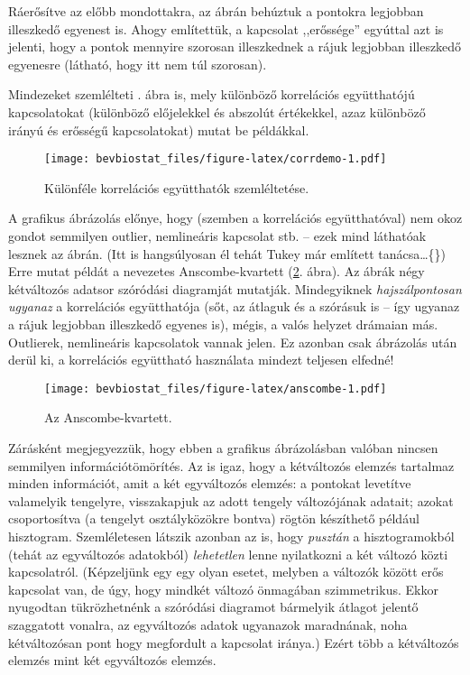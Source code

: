 \documentclass[
]{book}
\begin{document}
Ráerősítve az előbb mondottakra, az ábrán behúztuk a pontokra legjobban illeszkedő egyenest is. Ahogy említettük, a kapcsolat ,,erőssége'' egyúttal azt is jelenti, hogy a pontok mennyire szorosan illeszkednek a rájuk legjobban illeszkedő egyenesre (látható, hogy itt nem túl szorosan).

Mindezeket szemlélteti . ábra is, mely különböző korrelációs együtthatójú kapcsolatokat (különböző előjelekkel és abszolút értékekkel, azaz különböző irányú és erősségű kapcsolatokat) mutat be példákkal.

\begin{figure}
\centering
\texttt{[image: bevbiostat\_files/figure-latex/corrdemo-1.pdf]}
\caption{\label{fig:corrdemo}Különféle korrelációs együtthatók szemléltetése.}
\end{figure}

A grafikus ábrázolás előnye, hogy (szemben a korrelációs együtthatóval) nem okoz gondot semmilyen outlier, nemlineáris kapcsolat stb. -- ezek mind láthatóak lesznek az ábrán. (Itt is hangsúlyosan él tehát Tukey már említett tanácsa\dots\{\}) Erre mutat példát a nevezetes Anscombe-kvartett (\ref{fig:anscombe}. ábra). Az ábrák négy kétváltozós adatsor szóródási diagramját mutatják. Mindegyiknek \emph{hajszálpontosan ugyanaz} a korrelációs együtthatója (sőt, az átlaguk és a szórásuk is -- így ugyanaz a rájuk legjobban illeszkedő egyenes is), mégis, a valós helyzet drámaian más. Outlierek, nemlineáris kapcsolatok vannak jelen. Ez azonban csak ábrázolás után derül ki, a korrelációs együttható használata mindezt teljesen elfedné!

\begin{figure}
\centering
\texttt{[image: bevbiostat\_files/figure-latex/anscombe-1.pdf]}
\caption{\label{fig:anscombe}Az Anscombe-kvartett.}
\end{figure}

Zárásként megjegyezzük, hogy ebben a grafikus ábrázolásban valóban nincsen semmilyen információtömörítés. Az is igaz, hogy a kétváltozós elemzés tartalmaz minden információt, amit a két egyváltozós elemzés: a pontokat levetítve valamelyik tengelyre, visszakapjuk az adott tengely változójának adatait; azokat csoportosítva (a tengelyt osztályközökre bontva) rögtön készíthető például hisztogram. Szemléletesen látszik azonban az is, hogy \emph{pusztán} a hisztogramokból (tehát az egyváltozós adatokból) \emph{lehetetlen} lenne nyilatkozni a két változó közti kapcsolatról. (Képzeljünk egy egy olyan esetet, melyben a változók között erős kapcsolat van, de úgy, hogy mindkét változó önmagában szimmetrikus. Ekkor nyugodtan tükrözhetnénk a szóródási diagramot bármelyik átlagot jelentő szaggatott vonalra, az egyváltozós adatok ugyanazok maradnának, noha kétváltozósan pont hogy megfordult a kapcsolat iránya.) Ezért több a kétváltozós elemzés mint két egyváltozós elemzés.
\end{document}
